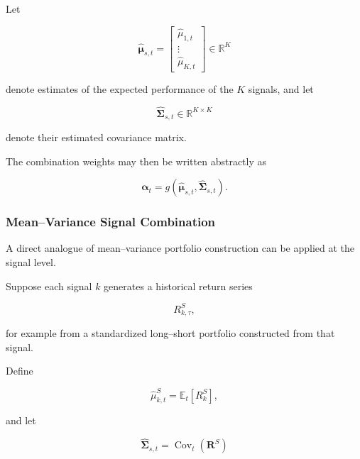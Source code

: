\documentclass[11pt,a4paper]{article}
\begin{document}
Let

\begin{equation}
\widehat{\boldsymbol{\mu}}_{s,t}
=
\begin{bmatrix}
\widehat{\mu}_{1,t}
\\
\vdots
\\
\widehat{\mu}_{K,t}
\end{bmatrix}
\in
\mathbb{R}^{K}
\end{equation}

denote estimates of the expected performance of the $K$ signals, and let

\begin{equation}
\widehat{\boldsymbol{\Sigma}}_{s,t}
\in
\mathbb{R}^{K\times K}
\end{equation}

denote their estimated covariance matrix.

The combination weights may then be written abstractly as

\begin{equation}
\boxed{
\boldsymbol{\alpha}_t
=
g
\left(
\widehat{\boldsymbol{\mu}}_{s,t},
\widehat{\boldsymbol{\Sigma}}_{s,t}
\right).
}
\end{equation}


\subsubsection{Mean--Variance Signal Combination}

A direct analogue of mean--variance portfolio construction can be applied at
the signal level.

Suppose each signal $k$ generates a historical return series

\begin{equation}
R_{k,\tau}^{S},
\end{equation}

for example from a standardized long--short portfolio constructed from that
signal.

Define

\begin{equation}
\widehat{\mu}_{k,t}^{S}
=
\mathbb{E}_t
\left[
R_{k}^{S}
\right],
\end{equation}

and let

\begin{equation}
\widehat{\boldsymbol{\Sigma}}_{s,t}
=
\operatorname{Cov}_t
\left(
\mathbf{R}^{S}
\right)
\end{equation}
\end{document}
